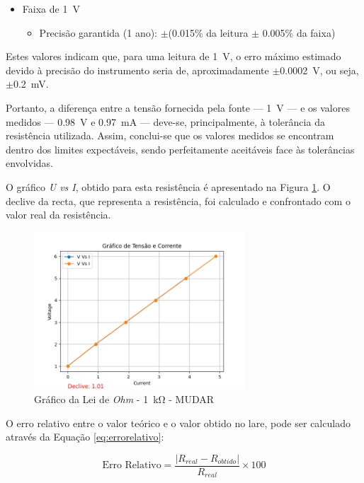 \begin{itemize}
	\item Faixa de \SI{1}{\volt}
	\begin{itemize}
		\item Precisão garantida (1 ano): $\pm$(0.015\% da leitura $\pm$ 0.005\% da faixa)
	\end{itemize}
\end{itemize}

Estes valores indicam que, para uma leitura de \SI{1}{\volt}, o erro máximo estimado devido à precisão do instrumento seria de, aproximadamente $\pm$\SI{0.0002}{\volt}, ou seja, $\pm$\SI{0.2}{\milli\volt}.

Portanto, a diferença entre a tensão fornecida pela fonte — \SI{1}{\volt} — e os valores medidos — \SI{0.98}{\volt} e \SI{0.97}{\milli\ampere} — deve-se, principalmente, à tolerância da resistência utilizada. Assim, conclui-se que os valores medidos se encontram dentro dos limites expectáveis, sendo perfeitamente aceitáveis face às tolerâncias envolvidas.

O gráfico \textit{U vs I}, obtido para esta resistência é apresentado na Figura \ref{fig:grafico_LaRE_1k}. O declive da recta, que representa a resistência, foi calculado e confrontado com o valor real da resistência. 

\begin{figure}[hbtp]
	\centering
	\includegraphics[width=0.7\textwidth]{figures/ohm_graph.png}
	\caption{Gráfico da Lei de \textit{Ohm} - \SI{1}{\kilo\ohm} - MUDAR}
	\label{fig:grafico_LaRE_1k}
\end{figure}

O erro relativo entre o valor teórico e o valor obtido no \acrshort{lare}, pode ser calculado através da Equação \ref{eq:errorelativo}:

\begin{equation} \label{eq:errorelativo}
	\text{Erro Relativo} = \frac{|R_{real} - R_{obtido}|}{R_{real}} \times 100
\end{equation}

